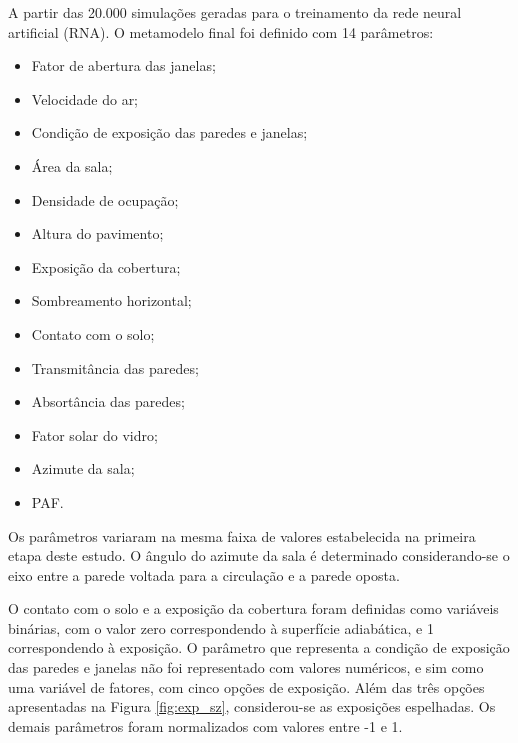 \documentclass[brazil,hardcopy,openany,a4paper]{ufscthesis}
\begin{document}
	A partir das 20.000 simulações geradas para o treinamento da rede neural artificial (RNA). %
	O metamodelo final foi definido com 14 parâmetros:
	\begin{itemize}
		\item Fator de abertura das janelas;
		\item Velocidade do ar;
		\item Condição de exposição das paredes e janelas;
		\item Área da sala;
		\item Densidade de ocupação;
		\item Altura do pavimento;
		\item Exposição da cobertura;
		\item Sombreamento horizontal;
		\item Contato com o solo;
		\item Transmitância das paredes;
		\item Absortância das paredes;
		\item Fator solar do vidro;
		\item Azimute da sala;
		\item PAF.
	\end{itemize}
	
	Os parâmetros variaram na mesma faixa de valores estabelecida na primeira etapa deste estudo. O ângulo do azimute da sala é determinado considerando-se o eixo entre a parede voltada para a circulação e a parede oposta.
	
	O contato com o solo e a exposição da cobertura foram definidas como variáveis binárias, com o valor zero correspondendo à superfície adiabática, e 1 correspondendo à exposição.
	O parâmetro que representa a condição de exposição das paredes e janelas não foi representado com valores numéricos, e sim como uma variável de fatores, com cinco opções de exposição. Além das três opções apresentadas na Figura \ref{fig:exp_sz}, considerou-se as exposições espelhadas. 	
	Os demais parâmetros foram normalizados com valores entre -1 e 1.
	
\end{document}
